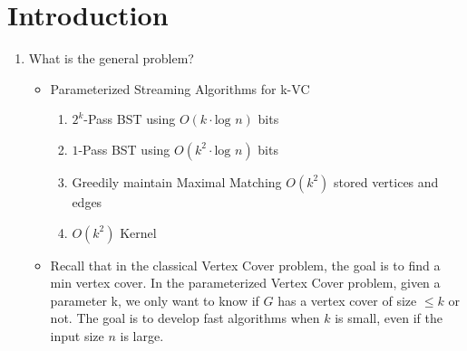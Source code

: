 \section{Introduction}



\begin{enumerate}
    \item What is the general problem?
          \begin{itemize}
              \item Parameterized Streaming Algorithms for k-VC
                    \begin{enumerate}
                        \item $2^k$-Pass BST using $O(k \cdot \text{log } n)$ bits
                        \item $1$-Pass BST using $O(k^2 \cdot \text{log } n)$ bits
                        \item Greedily maintain Maximal Matching $O(k^2)$ stored vertices and edges
                        \item $O(k^2)$ Kernel
                    \end{enumerate}
              \item {}Recall that in the classical Vertex Cover problem, the goal is to find a min vertex cover. In the parameterized Vertex Cover problem, given a parameter k, we only want to know if $G$ has a vertex cover of size $\leq k$ or not. The goal is to develop fast algorithms when $k$ is small, even if the input size $n$ is large.

\end{itemize}
\end{enumerate}
